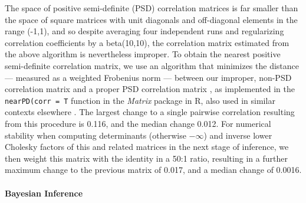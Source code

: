 \documentclass[12pt, twocolumn, twoside]{article}
\begin{document}
The space of positive semi-definite (PSD) correlation matrices is far smaller than the space of square matrices with unit diagonals and off-diagonal elements in the range (-1,1), and so despite averaging four independent runs and regularizing correlation coefficients by a beta(10,10), the correlation matrix estimated from the above algorithm is nevertheless improper. To obtain the nearest positive semi-definite correlation matrix, we use an algorithm that minimizes the distance --- measured as a weighted Frobenius norm --- between our improper, non-PSD correlation matrix and a proper PSD correlation matrix \citep{highamComputingNearestCorrelation2002a}, as implemented in the \texttt{nearPD(corr = T} function in the \textit{Matrix} package \citep{batesPackageMatrix2019a} in R, also used in similar contexts elsewhere \citep{blowsPhenomewideDistributionGenetic2015a}. The largest change to a single pairwise correlation resulting from this procedure is 0.116, and the median change 0.012.  For numerical stability when computing determinants (otherwise $-\infty$) and inverse lower Cholesky factors of this and related matrices in the next stage of inference, we then weight this matrix with the identity in a 50:1 ratio, resulting in a further maximum change to the previous matrix of 0.017, and a median change of 0.0016. 

\paragraph{Bayesian Inference}
\end{document}
